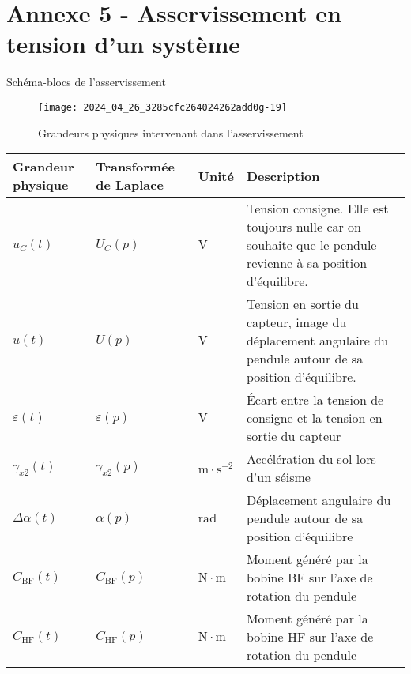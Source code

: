 \section*{Annexe 5 - Asservissement en tension d'un système}
Schéma-blocs de l'asservissement

\begin{figure}[!h]
\centering
\texttt{[image: 2024\_04\_26\_3285cfc264024262add0g-19]}
\caption{Grandeurs physiques intervenant dans l'asservissement}
\end{figure}


\begin{center}
\begin{tabular}{p{2cm}p{2cm}p{1cm}p{10cm}}
\hline
Grandeur physique & Transformée de Laplace  & Unité & Description \\
\hline
$u_{C}(t)$ & $U_{C}(p)$ & $\mathrm{V}$ & Tension consigne. Elle est toujours nulle car on souhaite que le pendule revienne à sa position d'équilibre.  \\
\hline
$u(t)$ & $U(p)$ & $\mathrm{V}$ & Tension en sortie du capteur, image du déplacement angulaire du pendule autour de sa position d'équilibre. \\
\hline
$\varepsilon(t)$ & $\varepsilon(p)$ & $\mathrm{V}$ & Écart entre la tension de consigne et la tension en sortie du capteur  \\
\hline
$\gamma_{x 2}(t)$ & $\gamma_{x 2}(p)$ & $\mathrm{m} \cdot \mathrm{s}^{-2}$ & Accélération du sol lors d'un séisme \\
\hline
$\Delta \alpha(t)$ & $\alpha(p)$ & $\mathrm{rad}$ & Déplacement angulaire du pendule autour de sa position d'équilibre \\
\hline
$C_{\mathrm{BF}}(t)$ & $C_{\mathrm{BF}}(p)$ & $\mathrm{N} \cdot \mathrm{m}$ & Moment généré par la bobine BF sur l'axe de rotation du pendule \\
\hline
$C_{\mathrm{HF}}(t)$ & $C_{\mathrm{HF}}(p)$ & $\mathrm{N} \cdot \mathrm{m}$ & Moment généré par la bobine HF sur l'axe de rotation du pendule \\
\hline
\end{tabular}
\end{center}

